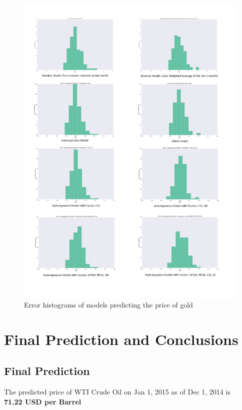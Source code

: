 \documentclass[runningheads]{llncs}
\begin{document}
\begin{figure}
\centering
\includegraphics[width=\textwidth]{GoldErrorHistogram.png}
\caption{Error histograms of models predicting the price of gold}
\label{fig:GoldErrorHistogram.png}
\end{figure}


\newpage
\section{Final Prediction and Conclusions}
\subsection {Final Prediction}
\noindent The predicted price of WTI Crude Oil on Jan 1, 2015 as of Dec 1, 2014 is \\
\textbf{71.22 USD per Barrel} \\
\end{document}
